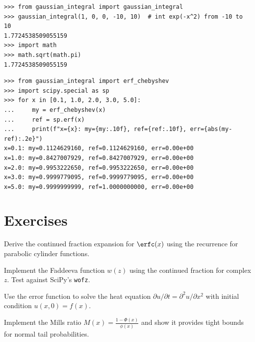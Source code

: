 \begin{example}
\begin{lstlisting}[style=python]
>>> from gaussian_integral import gaussian_integral
>>> gaussian_integral(1, 0, 0, -10, 10)  # int exp(-x^2) from -10 to 10
1.7724538509055159
>>> import math
>>> math.sqrt(math.pi)
1.7724538509055159
\end{lstlisting}
\end{example}

\begin{example}
\begin{lstlisting}[style=python]
>>> from gaussian_integral import erf_chebyshev
>>> import scipy.special as sp
>>> for x in [0.1, 1.0, 2.0, 3.0, 5.0]:
...     my = erf_chebyshev(x)
...     ref = sp.erf(x)
...     print(f"x={x}: my={my:.10f}, ref={ref:.10f}, err={abs(my-ref):.2e}")
x=0.1: my=0.1124629160, ref=0.1124629160, err=0.00e+00
x=1.0: my=0.8427007929, ref=0.8427007929, err=0.00e+00
x=2.0: my=0.9953222650, ref=0.9953222650, err=0.00e+00
x=3.0: my=0.9999779095, ref=0.9999779095, err=0.00e+00
x=5.0: my=0.9999999999, ref=1.0000000000, err=0.00e+00
\end{lstlisting}
\end{example}

\section{Exercises}

\begin{exercise}
Derive the continued fraction expansion for $\erfc(x)$ using the recurrence for parabolic cylinder functions.
\end{exercise}

\begin{exercise}
Implement the Faddeeva function $w(z)$ using the continued fraction for complex $z$. Test against SciPy's \texttt{wofz}.
\end{exercise}

\begin{exercise}
Use the error function to solve the heat equation $\partial u/\partial t = \partial^2 u/\partial x^2$ with initial condition $u(x,0) = f(x)$.
\end{exercise}

\begin{exercise}
Implement the Mills ratio  $M(x) = \frac{1-\Phi(x)}{\phi(x)}$ and show it provides tight bounds for normal tail probabilities.
\end{exercise}



